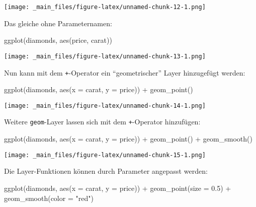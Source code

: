 \documentclass[11pt,german,a4paper]{article}
\newenvironment{Shaded}{\begin{snugshade}}{\end{snugshade}}
\newcommand{\AttributeTok}[1]{\textcolor[rgb]{0.77,0.63,0.00}{#1}}
\newcommand{\FloatTok}[1]{\textcolor[rgb]{0.00,0.00,0.81}{#1}}
\newcommand{\FunctionTok}[1]{\textcolor[rgb]{0.00,0.00,0.00}{#1}}
\newcommand{\NormalTok}[1]{#1}
\newcommand{\SpecialCharTok}[1]{\textcolor[rgb]{0.00,0.00,0.00}{#1}}
\newcommand{\StringTok}[1]{\textcolor[rgb]{0.31,0.60,0.02}{#1}}
\begin{document}
\texttt{[image: \_main\_files/figure-latex/unnamed-chunk-12-1.png]}

Das gleiche ohne Parameternamen:

\begin{Shaded}
\begin{Highlighting}[]
\FunctionTok{ggplot}\NormalTok{(diamonds, }\FunctionTok{aes}\NormalTok{(price, carat))}
\end{Highlighting}
\end{Shaded}

\texttt{[image: \_main\_files/figure-latex/unnamed-chunk-13-1.png]}

Nun kann mit dem \texttt{+}-Operator ein ``geometrischer'' Layer hinzugefügt werden:

\begin{Shaded}
\begin{Highlighting}[]
\FunctionTok{ggplot}\NormalTok{(diamonds, }\FunctionTok{aes}\NormalTok{(}\AttributeTok{x =}\NormalTok{ carat, }\AttributeTok{y =}\NormalTok{ price)) }\SpecialCharTok{+}
  \FunctionTok{geom\_point}\NormalTok{()}
\end{Highlighting}
\end{Shaded}

\texttt{[image: \_main\_files/figure-latex/unnamed-chunk-14-1.png]}

Weitere \texttt{geom}-Layer lassen sich mit dem \texttt{+}-Operator hinzufügen:

\begin{Shaded}
\begin{Highlighting}[]
\FunctionTok{ggplot}\NormalTok{(diamonds, }\FunctionTok{aes}\NormalTok{(}\AttributeTok{x =}\NormalTok{ carat, }\AttributeTok{y =}\NormalTok{ price)) }\SpecialCharTok{+}
  \FunctionTok{geom\_point}\NormalTok{() }\SpecialCharTok{+}
  \FunctionTok{geom\_smooth}\NormalTok{()}
\end{Highlighting}
\end{Shaded}

\texttt{[image: \_main\_files/figure-latex/unnamed-chunk-15-1.png]}

Die Layer-Funktionen können durch Parameter angepasst werden:

\begin{Shaded}
\begin{Highlighting}[]
\FunctionTok{ggplot}\NormalTok{(diamonds, }\FunctionTok{aes}\NormalTok{(}\AttributeTok{x =}\NormalTok{ carat, }\AttributeTok{y =}\NormalTok{ price)) }\SpecialCharTok{+}
  \FunctionTok{geom\_point}\NormalTok{(}\AttributeTok{size =} \FloatTok{0.5}\NormalTok{) }\SpecialCharTok{+}
  \FunctionTok{geom\_smooth}\NormalTok{(}\AttributeTok{color =} \StringTok{"red"}\NormalTok{)}
\end{Highlighting}
\end{Shaded}
\end{document}
